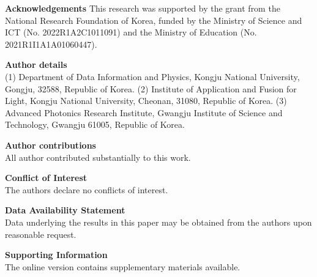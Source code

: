 \documentclass[%
 reprint,
superscriptaddress,
 amsmath,amssymb, aps,
]{revtex4-1}
\begin{document}

\bigskip
\noindent\textbf{Acknowledgements}
This research was supported by the grant from the National Research Foundation of Korea, funded by the Ministry of Science and ICT (No. 2022R1A2C1011091) and the Ministry of Education (No. 2021R1I1A1A01060447).

\bigskip
\noindent\textbf{Author details}\\ 
(1) Department of Data Information and Physics, Kongju National University, Gongju, 32588, Republic of Korea. (2) Institute of Application and Fusion for Light, Kongju National University, Cheonan, 31080, Republic of Korea. (3) Advanced Photonics Research Institute, Gwangju Institute of Science and Technology, Gwangju 61005, Republic of Korea.

\bigskip
\noindent\textbf{Author contributions}\\
All author contributed substantially to this work.

\bigskip
\noindent\textbf{Conflict of Interest}\\
The authors declare no conflicts of interest.

\bigskip
\noindent\textbf{Data Availability Statement}\\
Data underlying the results in this paper may be obtained from the authors upon reasonable request.

\bigskip
\noindent\textbf{Supporting Information}\\
The online version contains supplementary materials available.
\end{document}
